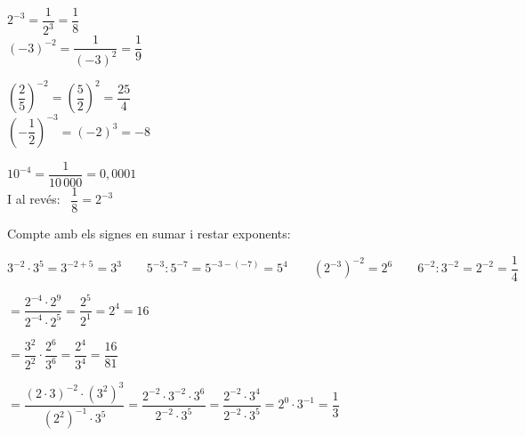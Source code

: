 \documentclass[11pt,a4paper]{article}
\begin{document}
\vfill
\begin{exemple}[Exemples]
\begin{minipage}[t]{0.32\linewidth}
$2^{-3}=\dfrac{1}{2^{3}}=\dfrac18$\\[5pt]
$(-3)^{-2}=\dfrac{1}{(-3)^{2}}=\dfrac19$
\end{minipage}\hfill
\begin{minipage}[t]{0.32\linewidth}
$\left(\dfrac25\right)^{-2}=\left(\dfrac52\right)^{2}=\dfrac{25}{4}$\\[5pt]
$\left(-\dfrac12\right)^{-3}=(-2)^{3}=-8$
\end{minipage}\hfill
\begin{minipage}[t]{0.32\linewidth}
$10^{-4}=\dfrac{1}{10\,000}=0{,}0001$\\[5pt]
I al revés: \ $\dfrac18=2^{-3}$
\end{minipage}
\end{exemple}

\vfill
\begin{idea}
Compte amb els signes en sumar i restar exponents:\\[4pt]
{\centering$3^{-2}\cdot3^{5}=3^{-2+5}=3^{3}\qquad 5^{-3}:5^{-7}=5^{-3-(-7)}=5^{4}\qquad \left(2^{-3}\right)^{-2}=2^{6}\qquad 6^{-2}:3^{-2}=2^{-2}=\dfrac14$\par}
\end{idea}

\vfill
\begin{minipage}[t]{0.49\linewidth}
\begin{exemple}
$=\dfrac{2^{-4}\cdot2^{9}}{2^{-4}\cdot2^{5}}=\dfrac{2^{5}}{2^{1}}=2^{4}=\boxed{16}$
\end{exemple}
\end{minipage}\hfill
\begin{minipage}[t]{0.48\linewidth}
\begin{exemple}
$=\dfrac{3^{2}}{2^{2}}\cdot\dfrac{2^{6}}{3^{6}}=\dfrac{2^{4}}{3^{4}}=\boxed{\dfrac{16}{81}}$
\end{exemple}
\end{minipage}

\vfill
\begin{exemple}
$=\dfrac{(2\cdot3)^{-2}\cdot\left(3^{2}\right)^{3}}{\left(2^{2}\right)^{-1}\cdot3^{5}}=\dfrac{2^{-2}\cdot3^{-2}\cdot3^{6}}{2^{-2}\cdot3^{5}}=\dfrac{2^{-2}\cdot3^{4}}{2^{-2}\cdot3^{5}}=2^{0}\cdot3^{-1}=\boxed{\dfrac13}$
\end{exemple}
\end{document}

